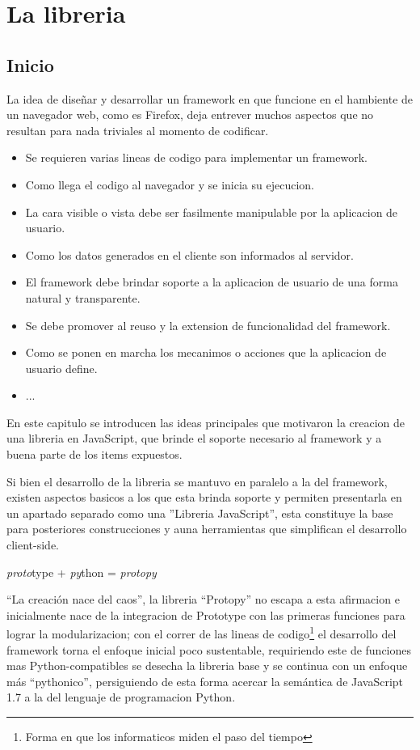\chapter{La libreria}

\section{Inicio}
La idea de diseñar y desarrollar un framework en que funcione en el hambiente
de un navegador web, como es Firefox, deja entrever muchos aspectos que no
resultan para nada triviales al momento de codificar.
\begin{itemize}
  \item Se requieren varias lineas de codigo para implementar un framework.
  \item Como llega el codigo al navegador y se inicia su ejecucion.
  \item La cara visible o vista debe ser fasilmente manipulable por la aplicacion
  de usuario.
  \item Como los datos generados en el cliente son informados al servidor.
  \item El framework debe brindar soporte a la aplicacion de usuario de una forma
  natural y transparente.
  \item Se debe promover al reuso y la extension de funcionalidad del framework.
  \item Como se ponen en marcha los mecanimos o acciones que la aplicacion de
  usuario define.
  \item ...
\end{itemize}
En este capitulo se introducen las ideas principales que motivaron la
creacion de una libreria en JavaScript, que brinde el soporte necesario al
framework y a buena parte de los items expuestos.

Si bien el desarrollo de la libreria se mantuvo en paralelo a la del
framework, existen aspectos basicos a los que esta brinda soporte y permiten
presentarla en un apartado separado como una ''Libreria JavaScript'', esta
constituye la base para posteriores construcciones y auna herramientas que
simplifican el desarrollo client-side.

\textit{proto}type + \textit{py}thon = \textit{protopy}

``La creación nace del caos'', la libreria ``Protopy'' no escapa a esta
afirmacion e inicialmente nace de la integracion de Prototype con
las primeras funciones para lograr la modularizacion; con el correr de las
lineas de codigo\footnote{Forma en que los informaticos miden el paso del
tiempo} el desarrollo del framework torna el enfoque inicial poco sustentable,
requiriendo este de funciones mas Python-compatibles se desecha la libreria
base y se continua con un enfoque más ``pythonico'', persiguiendo de esta forma
acercar la semántica de JavaScript 1.7 a la del lenguaje de programacion Python.

